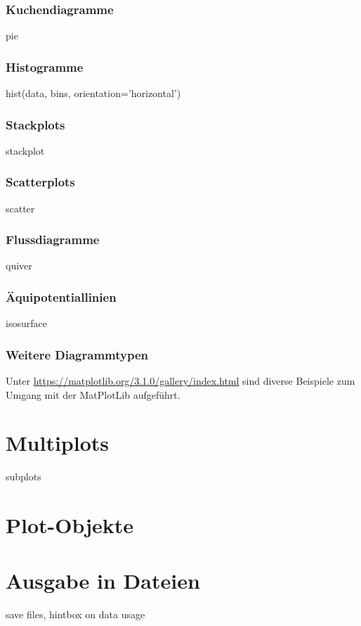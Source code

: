 \subsubsection{Kuchendiagramme}
pie
\subsubsection{Histogramme}
hist(data, bins, orientation='horizontal')
\subsubsection{Stackplots}
stackplot
\subsubsection{Scatterplots}
scatter
\subsubsection{Flussdiagramme}
quiver
\subsubsection{Äquipotentiallinien}
isosurface

\subsubsection{Weitere Diagrammtypen}
Unter \url{https://matplotlib.org/3.1.0/gallery/index.html} sind diverse Beispiele zum Umgang mit der MatPlotLib aufgeführt.


\section{Multiplots}
subplots

\section{Plot-Objekte}

\section{Ausgabe in Dateien}







save files, hintbox on data usage